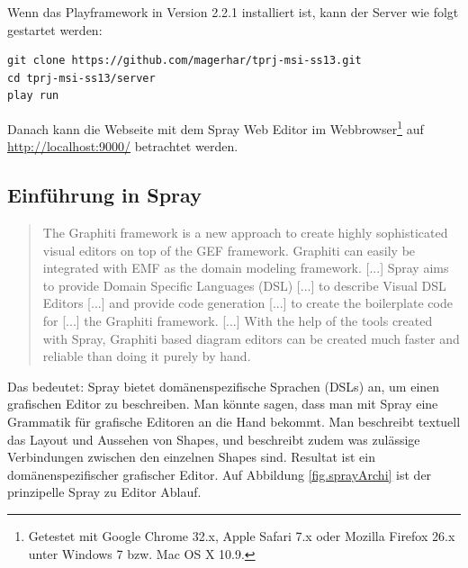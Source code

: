 \noindent Wenn das Playframework in Version 2.2.1 installiert ist,
kann der Server wie folgt gestartet werden:

\begin{verbatim}
git clone https://github.com/magerhar/tprj-msi-ss13.git
cd tprj-msi-ss13/server
play run
\end{verbatim}

\noindent Danach kann die Webseite mit dem Spray Web Editor im
Webbrowser\footnote{Getestet mit Google Chrome 32.x, Apple Safari 7.x oder Mozilla Firefox 26.x unter Windows 7 bzw. Mac OS X 10.9.}
auf \url{http://localhost:9000/} betrachtet werden.


\subsection{Einführung in Spray}

\begin{quote}
The Graphiti framework is a new approach to create highly sophisticated
visual editors on top of the GEF framework.
Graphiti can easily be integrated with EMF as the
domain modeling framework. [...]
Spray aims to provide Domain Specific Languages (DSL) [...]
to describe Visual DSL Editors [...]
and provide code generation [...] to create the boilerplate code
for [...] the Graphiti framework. [...]
With the help of the tools created with Spray,
Graphiti based diagram editors can be created much faster
and reliable than doing it purely by hand. \citep{sprayWebpage}
\end{quote}

\noindent Das bedeutet: Spray bietet domänenspezifische Sprachen (DSLs) an,
um einen grafischen Editor zu beschreiben. Man könnte sagen, dass
man mit Spray eine Grammatik für grafische Editoren an die Hand bekommt.
Man beschreibt textuell das Layout und Aussehen von Shapes, und beschreibt
zudem was zulässige Verbindungen zwischen den einzelnen Shapes sind.
Resultat ist ein domänenspezifischer grafischer Editor.
Auf Abbildung \ref{fig.sprayArchi} ist der prinzipelle Spray zu Editor Ablauf. 

